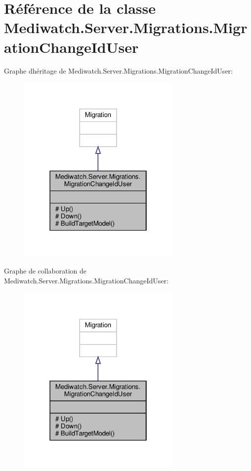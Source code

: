 \hypertarget{class_mediwatch_1_1_server_1_1_migrations_1_1_migration_change_id_user}{}\section{Référence de la classe Mediwatch.\+Server.\+Migrations.\+Migration\+Change\+Id\+User}
\label{class_mediwatch_1_1_server_1_1_migrations_1_1_migration_change_id_user}


Graphe d\textquotesingle{}héritage de Mediwatch.\+Server.\+Migrations.\+Migration\+Change\+Id\+User\+:\nopagebreak
\begin{figure}[H]
\begin{center}
\leavevmode
\includegraphics[width=226pt]{class_mediwatch_1_1_server_1_1_migrations_1_1_migration_change_id_user__inherit__graph}
\end{center}
\end{figure}


Graphe de collaboration de Mediwatch.\+Server.\+Migrations.\+Migration\+Change\+Id\+User\+:\nopagebreak
\begin{figure}[H]
\begin{center}
\leavevmode
\includegraphics[width=226pt]{class_mediwatch_1_1_server_1_1_migrations_1_1_migration_change_id_user__coll__graph}
\end{center}
\end{figure}

